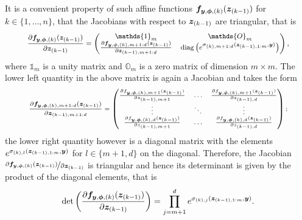 \documentclass[a4paper,12pt]{report}
\begin{document}
It is a convenient property of such affine functions $\bm{f}_{\bm{y},\bm{\phi},(k)}(\bm{z}_{(k-1)})$ for $k \in \{1,\dots,n\}$, that the Jacobians with respect to $\bm{z}_{(k-1)}$ are triangular, that is 
\begin{gather}\footnotesize\begin{gathered}
\frac{\partial \vect{f}_{\vect{y},\vect{\phi},(k)}(\vect{z}_{(k-1)})}{\partial \vect{z}_{(k-1)}} = 
\begin{pmatrix}
\mathds{1}_m & \mathds{O}_m \\
\frac{\partial \vect{f}_{\vect{y},\vect{\phi},(k),m+1:d}(\vect{z}_{(k-1)})}{\partial \vect{z}_{(k-1),m+1:d}} &  \mathrm{diag}\left(e^{\sigma_{(k),m+1:d}(\vect{z}_{(k-1),1:m},\vect{y})}\right)
\end{pmatrix},
\end{gathered}\end{gather} where $\mathds{1}_m$ is a unity matrix and $\mathds{O}_m$ is a zero matrix of dimension $m \times m$. The lower left quantity in the above matrix is again a Jacobian and takes the form \begin{gather}\scriptsize\begin{gathered}
\frac{\partial \bm{f}_{\bm{y},\bm{\phi},(k),m+1:d}(\bm{z}_{(k-1)})}{\partial \bm{z}_{(k-1),m+1:d}} = \begin{pmatrix}
\frac{\partial f_{\bm{y},\bm{\phi},(k),m+1}(\bm{z}_{(k-1)})}{\partial z_{(k-1),m+1}} & \dots & \frac{\partial f_{\bm{y},\bm{\phi},(k),m+1}(\bm{z}_{(k-1)})}{\partial z_{(k-1),d}} \\
\vdots & \ddots & \vdots \\
\frac{\partial f_{\bm{y},\bm{\phi},(k),d}(\bm{z}_{(k-1)})}{\partial z_{(k-1),m+1}} & \dots & \frac{\partial f_{\bm{y},\bm{\phi},(k),d}(\bm{z}_{(k-1)})}{\partial z_{(k-1),d}}
\end{pmatrix};
\end{gathered}\end{gather} the lower right quantity however is a diagonal matrix with the elements $e^{\sigma_{(k),l}(\bm{z}_{(k-1),1:m},\bm{y})}$ for $l \in \{m+1,d\}$ on the diagonal. Therefore, the Jacobian $\nicefrac{\partial \bm{f}_{\bm{y},\bm{\phi},(k)}(\bm{z}_{(k-1)})}{\partial \bm{z}_{(k-1)}}$ is triangular and hence its determinant is given by the product of the diagonal elements, that is \begin{equation}
\det\left(\frac{\partial \vect{f}_{\vect{y},\vect{\phi},(k)}(\vect{z}_{(k-1)})}{\partial \vect{z}_{(k-1)}}\right) = \prod_{j = m+1}^{d}e^{\sigma_{(k),j}(\vect{z}_{(k-1),1:m},\vect{y})}.

\end{equation}
\end{document}
